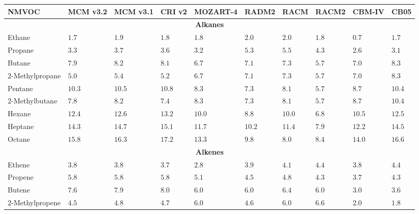 {%
    \renewcommand{\arraystretch}{1.1}%
    \begin{sidewaystable}%
        \begin{center}%
            \begin{tabular}{llllllllll}%
                \hline \hline
                \textbf{NMVOC} & \textbf{MCM v3.2} & \textbf{MCM v3.1} & \textbf{CRI v2} & \textbf{MOZART-4} & \textbf{RADM2} & \textbf{RACM} & \textbf{RACM2} & \textbf{CBM-IV} & \textbf{CB05} \\ 
                \hline \hline \multicolumn{10}{c}{\textbf{Alkanes}}  \\ \hline
                Ethane & $1.7$ & $1.9$ & $1.8$ & $1.8$ & $2.0$ & $2.0$ & $1.8$ & $0.7$ & $1.7$ \\
                Propane & $3.3$ & $3.7$ & $3.6$ & $3.2$ & $5.3$ & $5.5$ & $4.3$ & $2.6$ & $3.1$ \\
                Butane & $7.9$ & $8.2$ & $8.1$ & $6.7$ & $7.1$ & $7.3$ & $5.7$ & $7.0$ &$8.3$ \\
                $2$-Methylpropane & $5.0$ & $5.4$ & $5.2$ & $6.7$ & $7.1$ & $7.3$ & $5.7$ & $7.0$ & $8.3$ \\
                Pentane & $10.3$ & $10.5$ & $10.8$ & $8.3$ & $7.3$ & $8.1$ & $5.7$ & $8.7$ & $10.4$ \\
                $2$-Methylbutane & $7.8$ & $8.2$ & $7.4$ & $8.3$ & $7.3$ & $8.1$ & $5.7$ & $8.7$ & $10.4$ \\
                Hexane & $12.4$ & $12.6$ & $13.2$ & $10.0$ & $8.8$ & $10.0$ & $6.8$ & $10.5$ & $12.5$ \\
                Heptane & $14.3$ & $14.7$ & $15.1$ & $11.7$ & $10.2$ & $11.4$ & $7.9$ & $12.2$ & $14.5$ \\
                Octane & $15.8$ & $16.3$ & $17.2$ & $13.3$ & $9.8$ & $8.0$ & $8.4$ & $14.0$ & $16.6$ \\ \hline
                \multicolumn{10}{c}{\textbf{Alkenes}} \\ \hline
                Ethene & $3.8$ & $3.8$ & $3.7$ & $2.8$ & $3.9$ & $4.1$ & $4.4$ & $3.8$ & $4.4$ \\
                Propene & $5.8$ & $5.8$ & $5.8$ & $5.1$ & $4.5$ & $4.8$ & $4.3$ & $3.7$ & $4.3$ \\
                Butene & $7.6$ & $7.9$ & $8.0$ & $6.0$ & $6.0$ & $6.4$ & $6.0$ & $3.0$ & $3.6$ \\
                $2$-Methylpropene & $4.5$ & $4.8$ & $4.7$ & $6.0$ & $4.6$ & $6.0$ & $6.6$ & $2.0$ & $1.8$ \\

\end{tabular}
\end{center}
\end{sidewaystable}}
